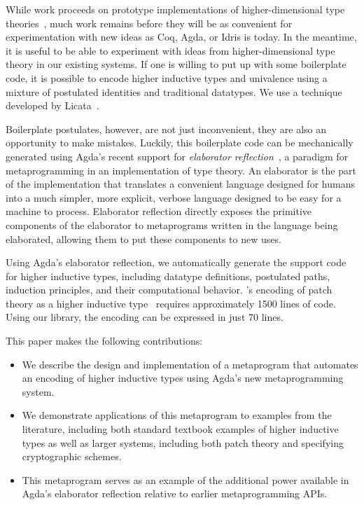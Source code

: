 \documentclass[sigplan,10pt]{acmart}
\begin{document}
While work proceeds on prototype implementations of higher-dimensional type theories~, much work remains before they will be as convenient for experimentation with new ideas as Coq, Agda, or Idris is today.
In the meantime, it is useful to be able to experiment with ideas from higher-dimensional type theory in our existing systems.
If one is willing to put up with some boilerplate code, it is possible to encode higher inductive types and univalence using a mixture of postulated identities and traditional datatypes.
We use a technique developed by Licata~\cite{Licata-2011}.

Boilerplate postulates, however, are not just inconvenient, they are also an opportunity to make mistakes.
Luckily, this boilerplate code can be mechanically generated using Agda's recent support for \emph{elaborator reflection}~\cite{David-2016}, a paradigm for metaprogramming in an implementation of type theory.
An elaborator is the part of the implementation that translates a convenient language designed for humans into a much simpler, more explicit, verbose language designed to be easy for a machine to process.
Elaborator reflection directly exposes the primitive components of the elaborator to metaprograms written in the language being elaborated, allowing them to put these components to new uses.


Using Agda's elaborator reflection, we automatically generate the support code for higher inductive types, including datatype definitions, postulated paths, induction principles, and their computational behavior.
\citeauthor{Angiuli-2014}'s encoding of patch theory as a higher inductive type~\citep{Angiuli-2014} requires approximately 1500 lines of code. Using our library, the encoding can be expressed in just 70 lines.


This paper makes the following contributions:
\begin{itemize}
\item We describe the design and implementation of a metaprogram that automates an encoding of higher inductive types using Agda's new metaprogramming system.
\item We demonstrate applications of this metaprogram to examples from the literature, including both standard textbook examples of higher inductive types as well as larger systems, including both patch theory and specifying cryptographic schemes.
\item This metaprogram serves as an example of the additional power available in Agda's elaborator reflection relative to earlier metaprogramming APIs.
\end{itemize}
\end{document}
